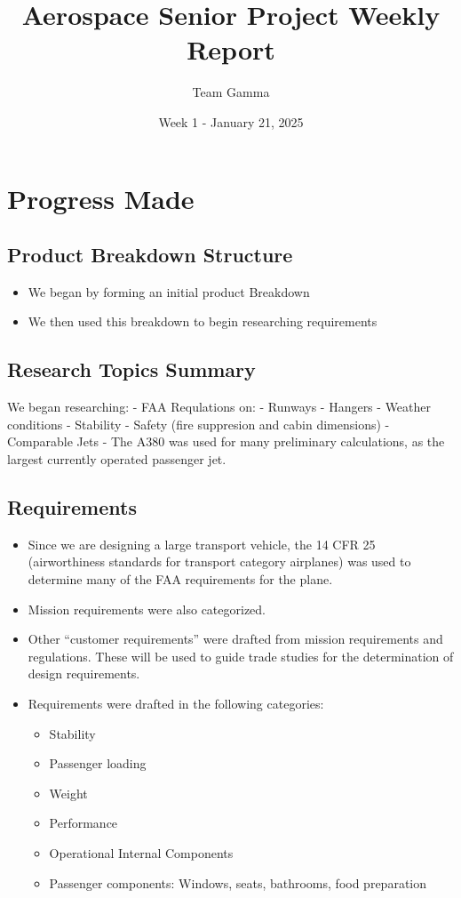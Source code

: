 \documentclass[10pt]{article}
\title{Aerospace Senior Project Weekly Report}
\author{Team Gamma}
\date{Week 1 - January 21, 2025}
\begin{document}
\maketitle

\section{Progress Made}\label{progress-made}

\subsection{Product Breakdown
Structure}\label{product-breakdown-structure}

\begin{itemize}
\tightlist
\item
  We began by forming an initial product Breakdown
\item
  We then used this breakdown to begin researching requirements
\end{itemize}

\subsection{Research Topics Summary}\label{research-topics-summary}

We began researching: - FAA Requlations on: - Runways - Hangers -
Weather conditions - Stability - Safety (fire suppresion and cabin
dimensions) - Comparable Jets - The A380 was used for many preliminary
calculations, as the largest currently operated passenger jet.

\subsection{Requirements}\label{requirements}

\begin{itemize}
\tightlist
\item
  Since we are designing a large transport vehicle, the 14 CFR 25
  (airworthiness standards for transport category airplanes) was used to
  determine many of the FAA requirements for the plane.
\item
  Mission requirements were also categorized.
\item
  Other ``customer requirements'' were drafted from mission requirements
  and regulations. These will be used to guide trade studies for the
  determination of design requirements.
\item
  Requirements were drafted in the following categories:

  \begin{itemize}
  \tightlist
  \item
    Stability
  \item
    Passenger loading
  \item
    Weight
  \item
    Performance
  \item
    Operational Internal Components
  \item
    Passenger components: Windows, seats, bathrooms, food preparation
  \end{itemize}
\end{itemize}
\end{document}
